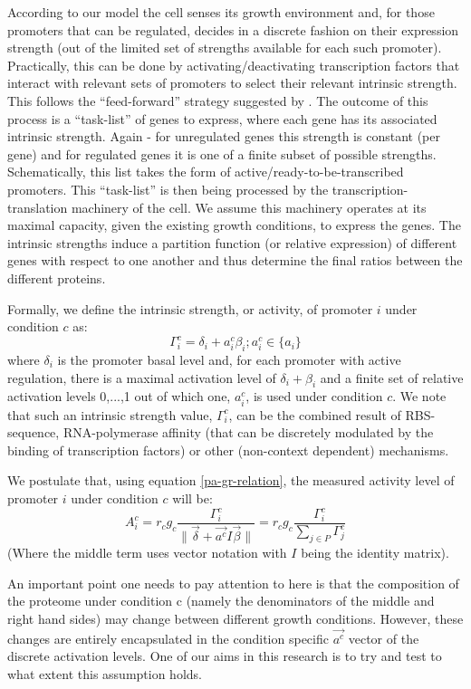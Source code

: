 \documentclass[a4page,notitlepage]{article}
\providecommand{\norm}[1]{\lVert#1\rVert}
\begin{document}
According to our model the cell senses its growth environment and, for those promoters that can be regulated, decides in a discrete fashion on their expression strength (out of the limited set of strengths available for each such promoter).
Practically, this can be done by activating/deactivating transcription factors that interact with relevant sets of promoters to select their relevant intrinsic strength.
This follows the ``feed-forward'' strategy suggested by \parencite{Levy2009}.
The outcome of this process is a ``task-list'' of genes to express, where each gene has its associated intrinsic strength.
Again - for unregulated genes this strength is constant (per gene) and for regulated genes it is one of a finite subset of possible strengths.
Schematically, this list takes the form of active/ready-to-be-transcribed promoters.
This ``task-list'' is then being processed by the transcription-translation machinery of the cell.
We assume this machinery operates at its maximal capacity, given the existing growth conditions, to express the genes.
The intrinsic strengths induce a partition function (or relative expression) of different genes with respect to one another and thus determine the final ratios between the different proteins.

Formally, we define the intrinsic strength, or activity, of promoter $i$ under condition $c$ as:
\[\Gamma^c_i=\delta_i+a^c_i\beta_i ; a^c_i\in \{a_i\}\]
where $\delta_i$ is the promoter basal level and, for each promoter with active regulation, there is a maximal activation level of $\delta_i+\beta_i$ and a finite set of relative activation levels {0,...,1} out of which one, $a^c_i$, is used under condition $c$.
We note that such an intrinsic strength value, $\Gamma^c_i$, can be the combined result of RBS-sequence, RNA-polymerase affinity (that can be discretely modulated by the binding of transcription factors) or other (non-context dependent) mechanisms.

We postulate that, using equation \ref{pa-gr-relation}, the measured activity level of promoter $i$ under condition $c$ will be:
\begin{equation}
\label{cond-act}
A^c_i=r_cg_c\frac{\Gamma^c_i}{\norm{\vec{\delta}+\vec{a^c}I\vec{\beta}}}=r_cg_c\frac{\Gamma^c_i}{\sum_{j\in P}\Gamma^c_j}
\end{equation}
(Where the middle term uses vector notation with $I$ being the identity matrix).

An important point one needs to pay attention to here is that the composition of the proteome under condition c (namely the denominators of the middle and right hand sides) may change between different growth conditions.
However, these changes are entirely encapsulated in the condition specific $\vec{a^c}$ vector of the discrete activation levels.
One of our aims in this research is to try and test to what extent this assumption holds.
\end{document}
